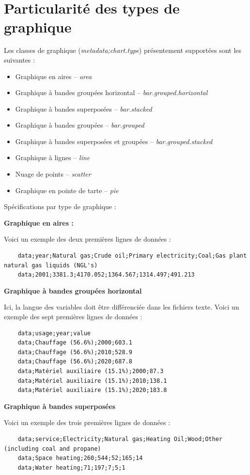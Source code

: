 \documentclass[11pt]{article}
\begin{document}
\pagebreak
\section{Particularité des types de graphique}

Les classes de graphique (\textit{metadata;chart.type}) présentement supportées sont les suivantes :
\begin{itemize}
    \item Graphique en aires -- \textit{area}
    \item Graphique à bandes groupées horizontal -- \textit{bar.grouped.horizontal}
    \item Graphique à bandes superposées -- \textit{bar.stacked}
    \item Graphique à bandes groupées -- \textit{bar.grouped}
    \item Graphique à bandes superposées et groupées -- \textit{bar.grouped.stacked}
    \item Graphique à lignes -- \textit{line}
    \item Nuage de points -- \textit{scatter}
    \item Graphique en pointe de tarte -- \textit{pie}
\end{itemize}

Spécifications par type de graphique :

\textbf{Graphique en aires :}

Voici un exemple des deux premières lignes de données :
\begin{lstlisting}
    data;year;Natural gas;Crude oil;Primary electricity;Coal;Gas plant natural gas liquids (NGL's)
    data;2001;3381.3;4170.052;1364.567;1314.497;491.213
\end{lstlisting}

\textbf{Graphique à bandes groupées horizontal}

Ici, la langue des variables doit être différenciée dans les fichiers texte. Voici un exemple des sept premières lignes de données :
\begin{lstlisting}
    data;usage;year;value
    data;Chauffage (56.6%);2000;603.1
    data;Chauffage (56.6%);2010;528.9
    data;Chauffage (56.6%);2020;687.8
    data;Matériel auxiliaire (15.1%);2000;87.3
    data;Matériel auxiliaire (15.1%);2010;138.1
    data;Matériel auxiliaire (15.1%);2020;183.8
\end{lstlisting}

\textbf{Graphique à bandes superposées}

Voici un exemple des trois premières lignes de données :
\begin{lstlisting}
    data;service;Electricity;Natural gas;Heating Oil;Wood;Other (including coal and propane)
    data;Space heating;260;544;52;165;14
    data;Water heating;71;197;7;5;1
\end{lstlisting}
\end{document}
